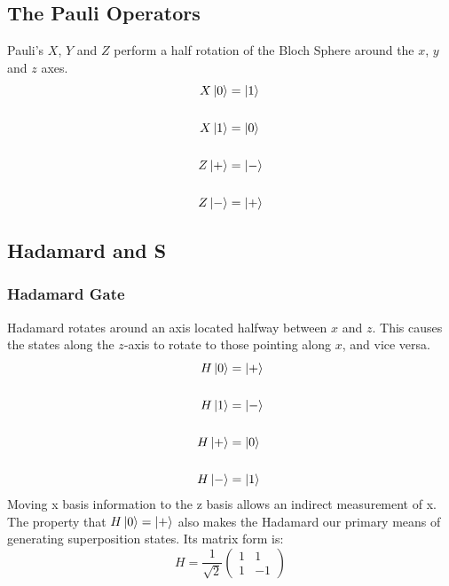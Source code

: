 \documentclass[hidelinks, a4paper, 12pt]{article}
\newcommand{\n}{\\[\baselineskip]}
\begin{document}
         \subsection{The Pauli Operators}
            Pauli's $X$, $Y$ and $Z$ perform a half rotation of the Bloch Sphere around the $x$, $y$ and $z$ axes.
            \[\begin{split}
                X\ket{0} &= \ket{1}\n
                X\ket{1} &= \ket{0}\n
                Z\ket{+} &= \ket{-}\n
                Z\ket{-} &= \ket{+}
            \end{split}\]
        
        \subsection{Hadamard and S}
            \subsubsection{Hadamard Gate}
                Hadamard rotates around an axis located halfway between $x$ and $z$. This causes the states along the $z$-axis to rotate to those pointing along $x$, and vice versa.
                \[\begin{split}
                    H\ket{0} &= \ket{+}\n
                    H\ket{1} &= \ket{-}\n
                    H\ket{+} &= \ket{0}\n
                    H\ket{-} &= \ket{1}
                \end{split}\]
                Moving x basis information to the z basis allows an indirect measurement of x.\n
                The property that $H\ket{0} = \ket{+}$ also makes the Hadamard our primary means of generating superposition states. Its matrix form is:
                \[H = \frac{1}{\sqrt{2}} \begin{pmatrix} 1 & 1 \\ 1 & -1 \end{pmatrix}\]
\end{document}
